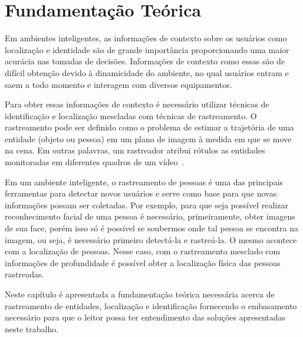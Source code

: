 \chapter{Fundamentação Teórica}
\label{cap:fundamentacao}


	Em ambientes inteligentes, as informações de contexto sobre os usuários como localização e identidade são de grande importância proporcionando uma maior acurácia nas tomadas de decisões. Informações de contexto como essas são de difícil obtenção devido à dinamicidade do ambiente, no qual usuários entram e saem a todo momento e interagem com diversos equipamentos.

	Para obter essas informações de contexto é necessário utilizar técnicas de identificação e localização mescladas com técnicas de rastreamento. O rastreamento pode ser definido como o problema de estimar a trajetória de uma entidade (objeto ou pessoa) em um plano de imagem à medida em que se move na cena. Em outras palavras, um rastreador atribui rótulos as entidades monitoradas em diferentes quadros de um vídeo~\cite{yilmaz}.

	Em um ambiente inteligente, o rastreamento de pessoas é uma das principais ferramentas para detectar novos usuários e serve como base para que novas informações possam ser coletadas. Por exemplo, para que seja possível realizar reconhecimento facial de uma pessoa é necessário, primeiramente, obter imagens de sua face, porém isso só é possível se soubermos onde tal pessoa se encontra na imagem, ou seja, é necessário primeiro detectá-la e rastreá-la. O mesmo acontece com a localização de pessoas. Nesse caso, com o rastreamento mesclado com informações de profundidade é possível obter a localização física das pessoas rastreadas. 

	Neste capítulo é apresentada a fundamentação teórica necessária acerca de rastreamento de entidades, localização e identificação fornecendo o embasamento necessário para que o leitor possa ter entendimento das soluções apresentadas neste trabalho.

